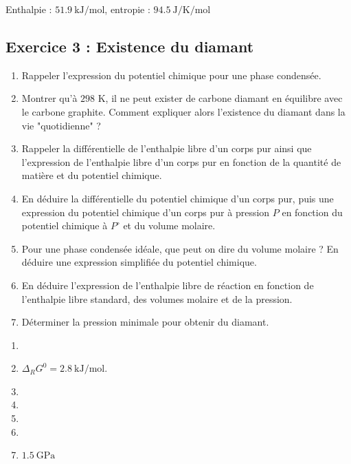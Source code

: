  Enthalpie : $\SI{51.9}{\kilo\joule\per\mole}$, entropie : $\SI{94.5}{\joule\per\kelvin\per\mole}$

\subsection{Exercice 3 : Existence du diamant}

\begin{enumerate}
	\item Rappeler l'expression du potentiel chimique pour une phase condensée.
	\item Montrer qu'à $298$ K, il ne peut exister de carbone diamant en équilibre avec le carbone graphite. Comment expliquer alors l'existence du diamant dans la vie "quotidienne" ?
	\item Rappeler la différentielle de l'enthalpie libre d'un corps pur ainsi que l'expression de l'enthalpie libre d'un corps pur en fonction de la quantité de matière et du potentiel chimique.
	\item En déduire la différentielle du potentiel chimique d'un corps pur, puis une expression du potentiel chimique d'un corps pur à pression $P$ en fonction du potentiel chimique à $P^\circ$ et du volume molaire.
	\item Pour une phase condensée idéale, que peut on dire du volume molaire ? En déduire une expression simplifiée du potentiel chimique.
	\item En déduire l'expression de l'enthalpie libre de réaction en fonction de l'enthalpie libre standard, des volumes molaire et de la pression.
	\item Déterminer la pression minimale pour obtenir du diamant.
\end{enumerate}

\begin{enumerate}
	\item
	\item $\Delta_R G^0 = \SI{2.8}{\kilo\joule\per\mole}$.
	\item 
	\item 
	\item 
	\item
	\item $\SI{1.5}{\giga\pascal}$
	
\end{enumerate}